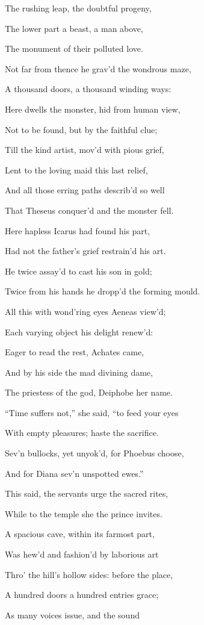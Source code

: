 The rushing leap, the doubtful progeny,

The lower part a beast, a man above,

The monument of their polluted love.

Not far from thence he grav’d the wondrous maze,

A thousand doors, a thousand winding ways:

Here dwells the monster, hid from human view,

Not to be found, but by the faithful clue;

Till the kind artist, mov’d with pious grief,

Lent to the loving maid this last relief,

And all those erring paths describ’d so well

That Theseus conquer’d and the monster fell.

Here hapless Icarus had found his part,

Had not the father’s grief restrain’d his art.

He twice assay’d to cast his son in gold;

Twice from his hands he dropp’d the forming mould.

All this with wond’ring eyes Aeneas view’d;

Each varying object his delight renew’d:

Eager to read the rest, Achates came,

And by his side the mad divining dame,

The priestess of the god, Deiphobe her name.

“Time suffers not,” she said, “to feed your eyes

With empty pleasures; haste the sacrifice.

Sev’n bullocks, yet unyok’d, for Phoebus choose,

And for Diana sev’n unspotted ewes.”

This said, the servants urge the sacred rites,

While to the temple she the prince invites.

A spacious cave, within its farmost part,

Was hew’d and fashion’d by laborious art

Thro’ the hill’s hollow sides: before the place,

A hundred doors a hundred entries grace;

As many voices issue, and the sound

